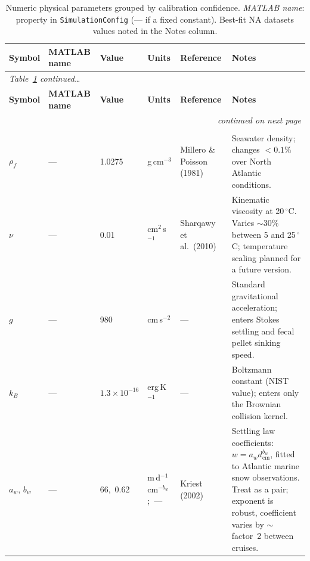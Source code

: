 \documentclass[12pt,a4paper]{report}
\numberwithin{equation}{chapter}
\begin{document}
\begin{landscape}
\begin{longtable}{p{1.5cm} p{2.5cm} p{2.0cm} p{2.0cm} p{2.5cm} p{9.5cm}}
\caption{Numeric physical parameters grouped by calibration confidence.
\textit{MATLAB name}: property in \texttt{SimulationConfig} (--- if a fixed
constant). Best-fit NA datasets values noted in the Notes column.}
\label{tab:param_groups}\\
\toprule
\textbf{Symbol} & \textbf{MATLAB name} & \textbf{Value} & \textbf{Units} &
\textbf{Reference} & \textbf{Notes} \\
\midrule
\endfirsthead
\multicolumn{6}{l}{\small\textit{Table~\ref{tab:param_groups} continued\ldots}}\\[2pt]
\toprule
\textbf{Symbol} & \textbf{MATLAB name} & \textbf{Value} & \textbf{Units} &
\textbf{Reference} & \textbf{Notes} \\
\midrule
\endhead
\midrule
\multicolumn{6}{r}{\small\textit{continued on next page}} \\
\endfoot
\bottomrule
\endlastfoot

\multicolumn{6}{@{}l}{\textit{\textbf{Group 1 --- fixed in all runs}}}\\[2pt]

$\rho_f$ & --- & 1.0275 & g\,cm$^{-3}$ &
Millero \& Poisson (1981) &
Seawater density; changes $<0.1\%$ over North Atlantic conditions. \\[3pt]

$\nu$ & --- & 0.01 & cm$^2$\,s$^{-1}$ &
Sharqawy et al.\ (2010) &
Kinematic viscosity at 20\,$^\circ$C. Varies $\sim$30\% between 5 and 25\,$^\circ$C; temperature scaling planned for a future version. \\[3pt]

$g$ & --- & 980 & cm\,s$^{-2}$ &
--- &
Standard gravitational acceleration; enters Stokes settling and fecal pellet sinking speed. \\[3pt]

$k_B$ & --- & $1.3\times10^{-16}$ & erg\,K$^{-1}$ &
--- &
Boltzmann constant (NIST value); enters only the Brownian collision kernel. \\[3pt]

$a_w,\,b_w$ & --- & 66,\ 0.62 & m\,d$^{-1}$\,cm$^{-b_w}$;\ --- &
Kriest (2002) &
Settling law coefficients: $w = a_w d_\mathrm{cm}^{b_w}$, fitted to Atlantic marine snow observations. Treat as a pair; exponent is robust, coefficient varies by $\sim$factor~2 between cruises. \\[3pt]


\end{longtable}
\end{landscape}
\end{document}
